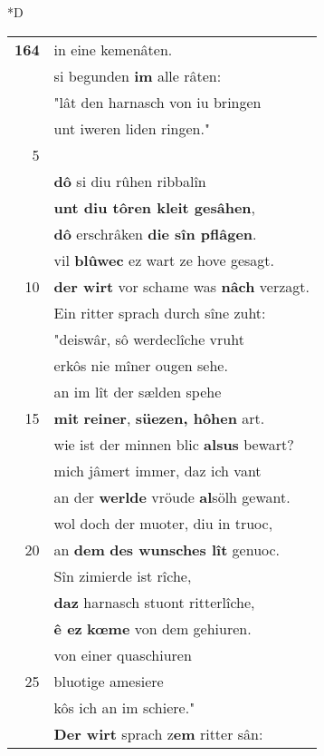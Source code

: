 \documentclass[8pt,a4paper,notitlepage]{article}
\begin{document}
\begin{table}[ht]
\begin{minipage}[t]{0.5\linewidth}
\small
\begin{center}*D
\end{center}
\begin{tabular}{rl}
\textbf{164} & in eine kemenâten.\\ 
 & si begunden \textbf{im} alle râten:\\ 
 & "lât den harnasch von iu bringen\\ 
 & unt iweren liden ringen."\\ 
5 & \textbf{\begin{large}S\end{large}chiere er muose entwâpent sîn}.\\ 
 & \textbf{dô} si diu rûhen ribbalîn\\ 
 & \textbf{unt diu tôren kleit gesâhen},\\ 
 & \textbf{dô} erschrâken \textbf{die sîn pflâgen}.\\ 
 & vil \textbf{blûwec} ez wart ze hove gesagt.\\ 
10 & \textbf{der wirt} vor schame was \textbf{nâch} verzagt.\\ 
 & Ein ritter sprach durch sîne zuht:\\ 
 & "deiswâr, sô werdeclîche vruht\\ 
 & erkôs nie mîner ougen sehe.\\ 
 & an im lît der sælden spehe\\ 
15 & \textbf{mit} \textbf{reiner}, \textbf{süezen, hôhen} art.\\ 
 & wie ist der minnen blic \textbf{alsus} bewart?\\ 
 & mich jâmert immer, daz ich vant\\ 
 & an der \textbf{werlde} vröude \textbf{al}sölh gewant.\\ 
 & wol doch der muoter, diu in truoc,\\ 
20 & an \textbf{dem} \textbf{des wunsches lît} genuoc.\\ 
 & Sîn zimierde ist rîche,\\ 
 & \textbf{daz} harnasch stuont ritterlîche,\\ 
 & \textbf{ê ez} \textbf{kœme} von dem gehiuren.\\ 
 & von einer quaschiuren\\ 
25 & bluotige amesiere\\ 
 & kôs ich an im schiere."\\ 
 & \textbf{Der wirt} sprach z\textbf{em} ritter sân:\\ 

\end{tabular}
\end{minipage}
\end{table}
\end{document}
